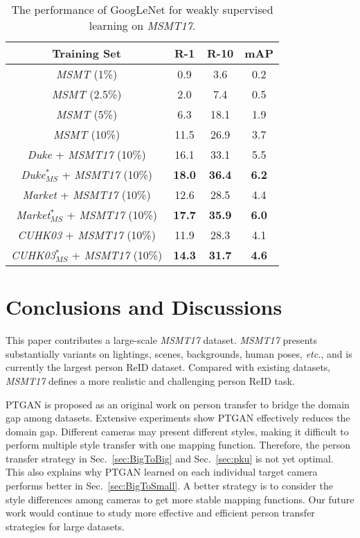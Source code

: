 \documentclass[10pt,twocolumn,letterpaper]{article}
\begin{document}
\begin{table}
\footnotesize
\begin{center}
\caption{The performance of GoogLeNet for weakly supervised learning on \emph{MSMT17}.}\label{tab:tab6}
\begin{tabular}{c|c|c|c}
\hline
{Training Set}       &R-1&R-10  &mAP\\
\hline
\hline
\emph{MSMT} (1\%) &0.9&3.6 &0.2\\
\emph{MSMT} (2.5\%) &2.0&7.4 &0.5\\
\emph{MSMT} (5\%) &6.3&18.1 &1.9\\
\emph{MSMT} (10\%) &11.5&26.9 &3.7\\
\hline
\emph{Duke} + \emph{MSMT17} (10\%)     &16.1&33.1 &5.5 \\
\emph{Duke}$^{*}_{MS}$ + \emph{MSMT17} (10\%)       &\textbf{18.0}&\textbf{36.4} &\textbf{6.2} \\
\hline
\emph{Market} + \emph{MSMT17} (10\%)     &12.6&28.5 &4.4 \\
\emph{Market}$^{*}_{MS}$ + \emph{MSMT17} (10\%)       &\textbf{17.7}&\textbf{35.9} &\textbf{6.0} \\
\hline

\emph{CUHK03} + \emph{MSMT17} (10\%)     &11.9&28.3 &4.1 \\
\emph{CUHK03}$^{*}_{MS}$ + \emph{MSMT17} (10\%)       &\textbf{14.3}&\textbf{31.7} &\textbf{4.6} \\
\hline
\end{tabular}
\end{center}
\vspace{-3mm}
\end{table}



\section{Conclusions and Discussions}\label{sec:discussion}
This paper contributes a large-scale \emph{MSMT17} dataset. \emph{MSMT17} presents substantially variants on lightings, scenes, backgrounds, human poses, \emph{etc.}, and is currently the largest person ReID dataset. Compared with existing datasets, \emph{MSMT17} defines a more realistic and challenging person ReID task.

PTGAN is proposed as an original work on person transfer to bridge the domain gap among datasets. Extensive experiments show PTGAN effectively reduces the domain gap. Different cameras may present different styles, making it difficult to perform multiple style transfer with one mapping function. Therefore, the person transfer strategy in Sec.~\ref{sec:BigToBig} and Sec.~\ref{sec:pku} is not yet optimal. This also explains why PTGAN learned on each individual target camera performs better in Sec.~\ref{sec:BigToSmall}. A better strategy is to consider the style differences among cameras to get more stable mapping functions. Our future work would continue to study more effective and efficient person transfer strategies for large datasets.


{\small


}
\end{document}
